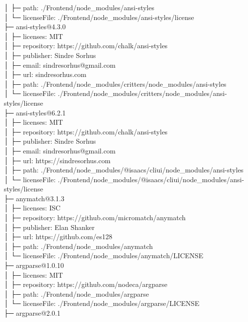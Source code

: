 │  ├─ path: ./Frontend/node\_modules/ansi-styles\\
│  └─ licenseFile: ./Frontend/node\_modules/ansi-styles/license\\
├─ ansi-styles@4.3.0\\
│  ├─ licenses: MIT\\
│  ├─ repository: https://github.com/chalk/ansi-styles\\
│  ├─ publisher: Sindre Sorhus\\
│  ├─ email: sindresorhus@gmail.com\\
│  ├─ url: sindresorhus.com\\
│  ├─ path: ./Frontend/node\_modules/critters/node\_modules/ansi-styles\\
│  └─ licenseFile: ./Frontend/node\_modules/critters/node\_modules/ansi-styles/license\\
├─ ansi-styles@6.2.1\\
│  ├─ licenses: MIT\\
│  ├─ repository: https://github.com/chalk/ansi-styles\\
│  ├─ publisher: Sindre Sorhus\\
│  ├─ email: sindresorhus@gmail.com\\
│  ├─ url: https://sindresorhus.com\\
│  ├─ path: ./Frontend/node\_modules/@isaacs/cliui/node\_modules/ansi-styles\\
│  └─ licenseFile: ./Frontend/node\_modules/@isaacs/cliui/node\_modules/ansi-styles/license\\
├─ anymatch@3.1.3\\
│  ├─ licenses: ISC\\
│  ├─ repository: https://github.com/micromatch/anymatch\\
│  ├─ publisher: Elan Shanker\\
│  ├─ url: https://github.com/es128\\
│  ├─ path: ./Frontend/node\_modules/anymatch\\
│  └─ licenseFile: ./Frontend/node\_modules/anymatch/LICENSE\\
├─ argparse@1.0.10\\
│  ├─ licenses: MIT\\
│  ├─ repository: https://github.com/nodeca/argparse\\
│  ├─ path: ./Frontend/node\_modules/argparse\\
│  └─ licenseFile: ./Frontend/node\_modules/argparse/LICENSE\\
├─ argparse@2.0.1\\
